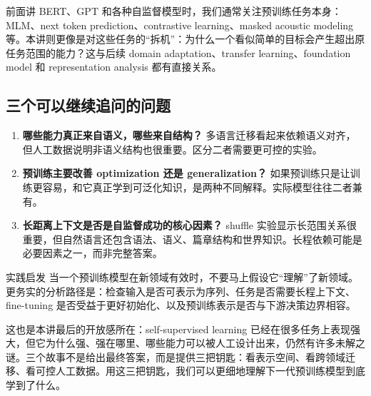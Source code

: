 \documentclass[a4paper]{article}
\begin{document}
前面讲 BERT、GPT 和各种自监督模型时，我们通常关注预训练任务本身：MLM、next token prediction、contrastive learning、masked acoustic modeling 等。本讲则更像是对这些任务的“拆机”：为什么一个看似简单的目标会产生超出原任务范围的能力？这与后续 domain adaptation、transfer learning、foundation model 和 representation analysis 都有直接关系。

\subsection{三个可以继续追问的问题}

\begin{enumerate}
    \item \textbf{哪些能力真正来自语义，哪些来自结构？} 多语言迁移看起来依赖语义对齐，但人工数据说明非语义结构也很重要。区分二者需要更可控的实验。
    \item \textbf{预训练主要改善 optimization 还是 generalization？} 如果预训练只是让训练更容易，和它真正学到可泛化知识，是两种不同解释。实际模型往往二者兼有。
    \item \textbf{长距离上下文是否是自监督成功的核心因素？} shuffle 实验显示长范围关系很重要，但自然语言还包含语法、语义、篇章结构和世界知识。长程依赖可能是必要因素之一，而非完整答案。
\end{enumerate}

\begin{importantbox}{实践启发}
    当一个预训练模型在新领域有效时，不要马上假设它“理解”了新领域。更务实的分析路径是：检查输入是否可表示为序列、任务是否需要长程上下文、fine-tuning 是否受益于更好初始化、以及预训练表示是否与下游决策边界相容。
\end{importantbox}

这也是本讲最后的开放感所在：self-supervised learning 已经在很多任务上表现强大，但它为什么强、强在哪里、哪些能力可以被人工设计出来，仍然有许多未解之谜。三个故事不是给出最终答案，而是提供三把钥匙：看表示空间、看跨领域迁移、看可控人工数据。用这三把钥匙，我们可以更细地理解下一代预训练模型到底学到了什么。
\end{document}
